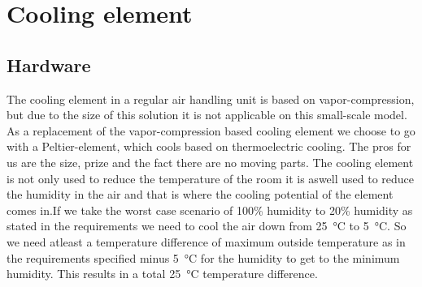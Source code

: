 \documentclass[a4paper,oneside]{book}
\begin{document}
\section{Cooling element}
\label{sec:cooling}

\subsection{Hardware}
The cooling element in a regular air handling unit is based on
vapor-compression, but due to the size of this solution it is not applicable on
this small-scale model. As a replacement of the vapor-compression based cooling
element we choose to go with a Peltier-element, which cools based on
thermoelectric cooling. The pros for us are the size, prize and the fact there
are no moving parts. The cooling element is not only used to reduce the
temperature of the room it is aswell used to reduce the humidity in the air and
that is where the cooling potential of the element comes in.If we take the
worst case scenario of 100\% humidity to 20\% humidity as stated in the
requirements we need to cool the air down from \SI{25}{\celsius} to
\SI{5}{\celsius}. So we need atleast a temperature difference of maximum
outside temperature as in the requirements specified minus \SI{5}{\celsius} for
the humidity to get to the minimum humidity. This results in a total
\SI{25}{\celsius} temperature difference.

\begin{table}[]
\centering
{}
\caption{Comparison of materials}
\label{tab:peltier}
\end{table}
\end{document}
